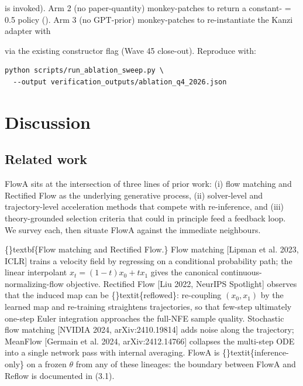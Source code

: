 \documentclass{article}
\begin{document}
 is invoked). Arm 2 (no paper-quantity) monkey-patches  to return a constant- = 0.5 policy (). Arm 3 (no GPT-prior) monkey-patches  to re-instantiate the Kanzi adapter with

 via the existing constructor flag (Wave 45 close-out). Reproduce with:

\begin{verbatim}
python scripts/run_ablation_sweep.py \
  --output verification_outputs/ablation_q4_2026.json
\end{verbatim}
\section{Discussion}
\subsection{Related work}
FlowA sits at the intersection of three lines of prior work: (i) flow matching and Rectified Flow as the underlying generative process, (ii) solver-level and trajectory-level acceleration methods that compete with re-inference, and (iii) theory-grounded selection criteria that could in principle feed a feedback loop. We survey each, then situate FlowA against the immediate neighbours.

\{\}textbf\{Flow matching and Rectified Flow.\} Flow matching [Lipman et al. 2023, ICLR] trains a velocity field by regressing on a conditional probability path; the linear interpolant $x_t = (1-t) x_0 + t x_1$ gives the canonical continuous-normalizing-flow objective. Rectified Flow [Liu 2022, NeurIPS Spotlight] observes that the induced map can be \{\}textit\{reflowed\}: re-coupling $(x_0, x_1)$ by the learned map and re-training straightens trajectories, so that few-step  ultimately one-step  Euler integration approaches the full-NFE sample quality. Stochastic flow matching [NVIDIA 2024, arXiv:2410.19814] adds noise along the trajectory; MeanFlow [Germain et al. 2024, arXiv:2412.14766] collapses the multi-step ODE into a single network pass with internal averaging. FlowA is \{\}textit\{inference-only\} on a frozen $\theta$ from any of these lineages: the boundary between FlowA and Reflow is documented in  (3.1).
\end{document}
